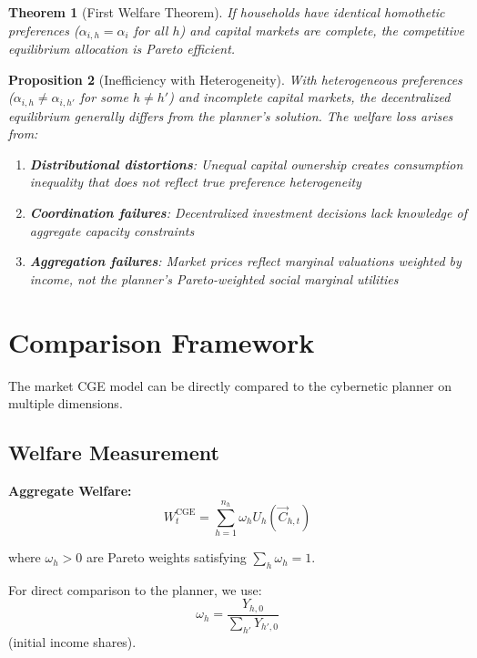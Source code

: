 \documentclass[12pt,a4paper]{article}
\newtheorem{theorem}{Theorem}[section]
\newtheorem{proposition}[theorem]{Proposition}
\theoremstyle{definition}
\theoremstyle{remark}
\begin{document}
\begin{theorem}[First Welfare Theorem]
If households have identical homothetic preferences ($\alpha_{i,h} = \alpha_i$ for all $h$) and capital markets are complete, the competitive equilibrium allocation is Pareto efficient.
\end{theorem}

\begin{proposition}[Inefficiency with Heterogeneity]
With heterogeneous preferences ($\alpha_{i,h} \neq \alpha_{i,h'}$ for some $h \neq h'$) and incomplete capital markets, the decentralized equilibrium generally differs from the planner's solution. The welfare loss arises from:
\begin{enumerate}[label=(\roman*)]
    \item \textbf{Distributional distortions}: Unequal capital ownership creates consumption inequality that does not reflect true preference heterogeneity
    \item \textbf{Coordination failures}: Decentralized investment decisions lack knowledge of aggregate capacity constraints
    \item \textbf{Aggregation failures}: Market prices reflect marginal valuations weighted by income, not the planner's Pareto-weighted social marginal utilities
\end{enumerate}
\end{proposition}

\section{Comparison Framework}

The market CGE model can be directly compared to the cybernetic planner on multiple dimensions.

\subsection{Welfare Measurement}

\textbf{Aggregate Welfare:}
\begin{equation}
    W_t^{\text{CGE}} = \sum_{h=1}^{n_h} \omega_h U_h(\vec{C}_{h,t})
\end{equation}

where $\omega_h > 0$ are Pareto weights satisfying $\sum_h \omega_h = 1$.

For direct comparison to the planner, we use:
\begin{equation}
    \omega_h = \frac{Y_{h,0}}{\sum_{h'} Y_{h',0}}
\end{equation}
(initial income shares).
\end{document}
